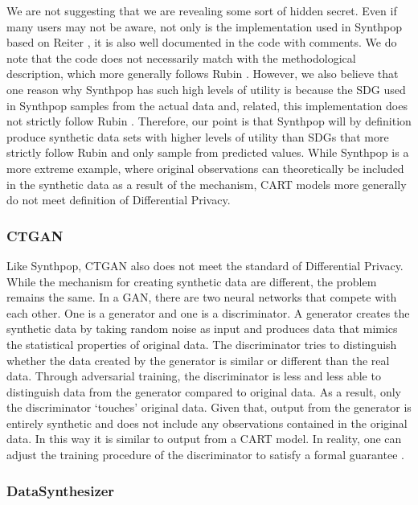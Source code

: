 \documentclass[runningheads]{llncs}
\begin{document}
We are not suggesting that we are revealing some sort of hidden secret.  Even if many users may not be aware, not only is the implementation used in Synthpop based on Reiter \cite{reiter2005using}, it is also well documented in the code with comments.  We do note that the code does not necessarily match with the methodological description, which more generally follows Rubin \cite{rubin1993statistical}.  However, we also believe that one reason why Synthpop has such high levels of utility is because the SDG used in Synthpop samples from the actual data and, related, this implementation does not strictly follow Rubin \cite{rubin1993statistical}.   Therefore, our point is that Synthpop will by definition produce synthetic data sets with higher levels of utility than SDGs that more strictly follow Rubin and only sample from predicted values.  While Synthpop is a more extreme example, where original observations can theoretically be included in the synthetic data as a result of the mechanism, CART models more generally do not meet definition of Differential Privacy.

\subsubsection{CTGAN}

Like Synthpop, CTGAN also does not meet the standard of Differential Privacy.  While the mechanism for creating synthetic data are different, the problem remains the same.  In a GAN, there are two neural networks that compete with each other.  One is a generator and one is a discriminator.  A generator creates the synthetic data by taking random noise as input and produces data that mimics the statistical properties of original data.  The discriminator tries to distinguish whether the data created by the generator is similar or different than the real data.  Through adversarial training, the discriminator is less and less able to distinguish data from the generator compared to original data.  As a result, only the discriminator `touches' original data.  Given that, output from the generator is entirely synthetic and does not include any observations contained in the original data.  In this way it is similar to output from a CART model.  In reality, one can adjust the training procedure of the discriminator to satisfy a formal guarantee \cite{beaulieu2019privacy,neunhoeffer2020private}.

\subsubsection{DataSynthesizer} 
\end{document}

